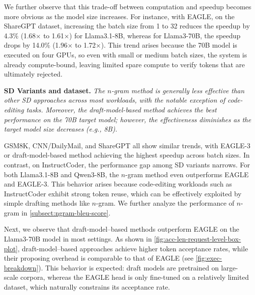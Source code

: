 We further observe that this trade-off between computation and speedup becomes more obvious as the model size increases. For instance, with EAGLE, on the ShareGPT dataset, increasing the batch size from 1 to 32 reduces the speedup by 4.3\% (1.68$\times$ to 1.61$\times$) for Llama3.1-8B, whereas for Llama3-70B, the speedup drops by 14.0\% (1.96$\times$ to 1.72$\times$). This trend arises because the 70B model is executed on four GPUs, so even with small or medium batch sizes, the system is already compute-bound, leaving limited spare compute to verify tokens that are ultimately rejected.


\begin{quoting}[leftmargin=1.5em, rightmargin=1.5em, vskip=0pt]
\textbf{SD Variants and dataset.}
\emph{
The $n$-gram method is generally less effective than other SD approaches across most workloads, with the notable exception of code-editing tasks. Moreover, the draft-model-based method achieves the best performance on the 70B target model; however, the effectiveness diminishes as the target model size decreases (e.g., 8B).}
\end{quoting}
GSM8K, CNN/DailyMail, and ShareGPT all show similar trends, with EAGLE-3 or draft-model-based method achieving the highest speedup across batch sizes. 
In contrast, on InstructCoder, the performance gap among SD variants narrows. For both Llama3.1-8B and Qwen3-8B, the $n$-gram method even outperforms EAGLE and EAGLE-3. This behavior arises because code-editing workloads such as InstructCoder exhibit strong token reuse, which can be effectively exploited by simple drafting methods like $n$-gram.
We further analyze the performance of $n$-gram in \autoref{subsect:ngram-bleu-score}.


Next, we observe that draft-model–based methods outperform EAGLE on the Llama3-70B model in most settings. As shown in \autoref{fig:acc-len-request-level-box-plot}, draft-model–based approaches achieve higher token acceptance rates, while their proposing overhead is comparable to that of EAGLE (see \autoref{fig:exec-breakdown}). This behavior is expected: draft models are pretrained on large-scale corpora, whereas the EAGLE head is only fine-tuned on a relatively limited dataset, which naturally constrains its acceptance rate.

